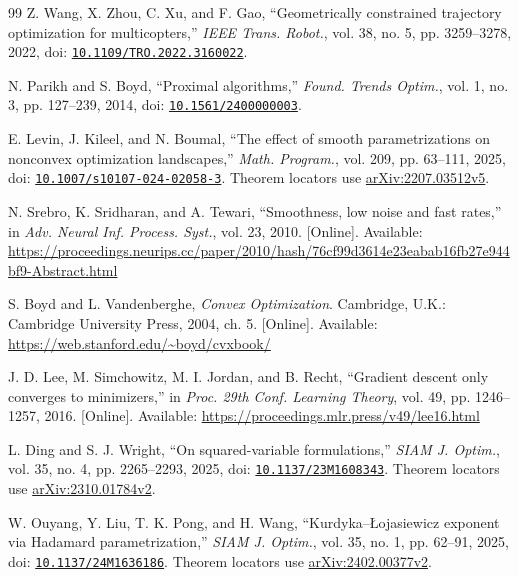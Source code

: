 \FloatBarrier
\begin{thebibliography}{99}
 Z. Wang, X. Zhou, C. Xu, and F. Gao, ``Geometrically constrained trajectory optimization for multicopters,'' \emph{IEEE Trans. Robot.}, vol. 38, no. 5, pp. 3259--3278, 2022, doi: \href{https://doi.org/10.1109/TRO.2022.3160022}{\nolinkurl{10.1109/TRO.2022.3160022}}.

 N. Parikh and S. Boyd, ``Proximal algorithms,'' \emph{Found. Trends Optim.}, vol. 1, no. 3, pp. 127--239, 2014, doi: \href{https://doi.org/10.1561/2400000003}{\nolinkurl{10.1561/2400000003}}.

 E. Levin, J. Kileel, and N. Boumal, ``The effect of smooth parametrizations on nonconvex optimization landscapes,'' \emph{Math. Program.}, vol. 209, pp. 63--111, 2025, doi: \href{https://doi.org/10.1007/s10107-024-02058-3}{\nolinkurl{10.1007/s10107-024-02058-3}}. Theorem locators use \href{https://arxiv.org/abs/2207.03512v5}{arXiv:2207.03512v5}.

 N. Srebro, K. Sridharan, and A. Tewari, ``Smoothness, low noise and fast rates,'' in \emph{Adv. Neural Inf. Process. Syst.}, vol. 23, 2010. [Online]. Available: \url{https://proceedings.neurips.cc/paper/2010/hash/76cf99d3614e23eabab16fb27e944bf9-Abstract.html}

 S. Boyd and L. Vandenberghe, \emph{Convex Optimization}. Cambridge, U.K.: Cambridge University Press, 2004, ch. 5. [Online]. Available: \url{https://web.stanford.edu/~boyd/cvxbook/}

 J. D. Lee, M. Simchowitz, M. I. Jordan, and B. Recht, ``Gradient descent only converges to minimizers,'' in \emph{Proc. 29th Conf. Learning Theory}, vol. 49, pp. 1246--1257, 2016. [Online]. Available: \url{https://proceedings.mlr.press/v49/lee16.html}

 L. Ding and S. J. Wright, ``On squared-variable formulations,'' \emph{SIAM J. Optim.}, vol. 35, no. 4, pp. 2265--2293, 2025, doi: \href{https://doi.org/10.1137/23M1608343}{\nolinkurl{10.1137/23M1608343}}. Theorem locators use \href{https://arxiv.org/abs/2310.01784v2}{arXiv:2310.01784v2}.

 W. Ouyang, Y. Liu, T. K. Pong, and H. Wang, ``Kurdyka--\L{}ojasiewicz exponent via Hadamard parametrization,'' \emph{SIAM J. Optim.}, vol. 35, no. 1, pp. 62--91, 2025, doi: \href{https://doi.org/10.1137/24M1636186}{\nolinkurl{10.1137/24M1636186}}. Theorem locators use \href{https://arxiv.org/abs/2402.00377v2}{arXiv:2402.00377v2}.


\end{thebibliography}
